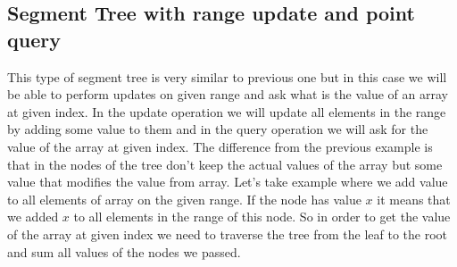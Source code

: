 \documentclass[11pt]{article}
\begin{document}
\subsection{Segment Tree with range update and point query}
This type of segment tree is very similar to previous one but in this case we will be able
to perform updates on given range and ask what is the value of an array at given index.
In the update operation we will update all elements in the range by adding some value to them
and in the query operation we will ask for the value of the array at given index.
The difference from the previous example is that in the nodes of the tree don't keep the
actual values of the array but some value that modifies the value from array. 
Let's take example where we add value to all elements of array on the given range. 
If the node has value $x$ it means that we added $x$ to all elements in the range of this node.
So in order to get the value of the array at given index we need to traverse the tree 
from the leaf to the root and sum all values of the nodes we passed.
\end{document}
